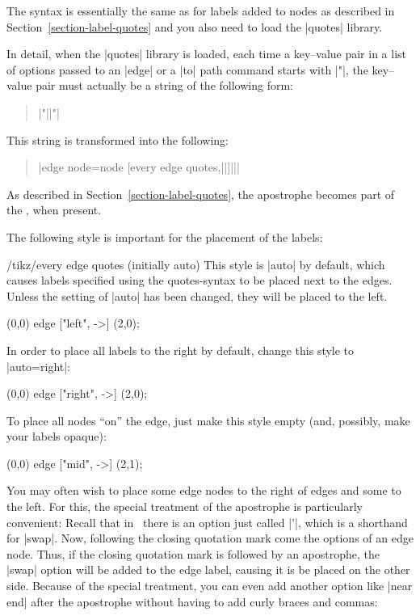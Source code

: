 The syntax is essentially the same as for labels added to nodes as
described in Section~\ref{section-label-quotes} and you also need to
load the |quotes| library.

In detail, when the |quotes| library is loaded, each time a key--value
pair in a list of options passed to an |edge| or a |to| path command
starts with |"|, the key--value pair must actually be a string of the
following form:
\begin{quote}
  |"||"|
\end{quote}
This string is transformed into the following:
\begin{quote}
  |edge node=node [every edge quotes,||]{||}|
\end{quote}
As described in Section~\ref{section-label-quotes}, the apostrophe
becomes part of the , when present.

The following style is important for the placement of the labels:
\begin{stylekey}{/tikz/every edge quotes (initially auto)}
  This style is |auto| by default, which causes labels specified using
  the quotes-syntax to be placed next to the edges. Unless the setting
  of |auto| has been changed, they will be placed to the left.
\begin{codeexample}[]
\tikz \draw (0,0) edge ["left", ->] (2,0);
\end{codeexample}

  In order to place all labels to the right by default, change this
  style to |auto=right|:
\begin{codeexample}[]
\tikz [every edge quotes/.style={auto=right}]
  \draw (0,0) edge ["right", ->] (2,0);
\end{codeexample}

  To place all nodes ``on'' the edge, just make this style empty (and,
  possibly, make your labels opaque):
\begin{codeexample}[]
\tikz [every edge quotes/.style={fill=white,font=\footnotesize}]
  \draw (0,0) edge ["mid", ->] (2,1);
\end{codeexample}
\end{stylekey}

You may often wish to place some edge nodes to the right of edges and
some to the left. For this, the special treatment of the apostrophe is
particularly convenient: Recall that in \tikzname\ there is an option
just called |'|, which is a shorthand for |swap|. Now, following the
closing quotation mark come the options of an edge node. Thus, if the
closing quotation mark is followed by an apostrophe, the |swap| option
will be added to the edge label, causing it is be placed on the other
side. Because of the special treatment, you can even add another
option like |near end| after the apostrophe without having to add
curly braces and commas:

